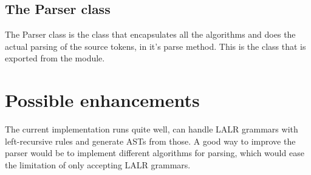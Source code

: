 \subsection{The Parser class}
The Parser class is the class that encapsulates all the algorithms and does the actual parsing of the source tokens, in it's parse method. This is the class that is exported from the module.
\section{Possible enhancements}
The current implementation runs quite well, can handle LALR grammars with left-recursive rules and generate ASTs from those.
A good way to improve the parser would be to implement different algorithms for parsing, which would ease the limitation of only accepting LALR grammars.









